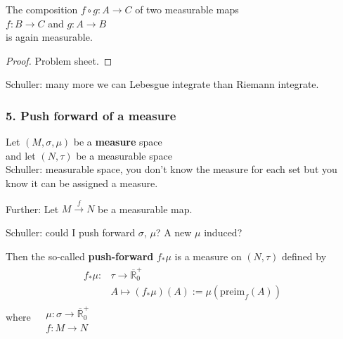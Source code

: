 \begin{theorem}
	The composition $f\circ g : A \to C$ of two measurable maps \\
	$f:B\to C$ and $g:A \to B$ \\
	is again measurable.
\end{theorem}

\begin{proof}
	Problem sheet.
\end{proof}

Schuller: many more we can Lebesgue integrate than Riemann integrate.

\subsubsection{5. Push forward of a measure}

Let $(M, \sigma, \mu)$ be a \textbf{measure} space \\
and let $(N, \tau)$ be a measurable space \\

Schuller: measurable space, you don't know the measure for each set but you know it can be assigned a measure.

Further: Let $M \xrightarrow{f} N$ be a measurable map.


Schuller: could I push forward $\sigma$, $\mu$? A new $\mu$ induced?

Then the so-called \textbf{push-forward} $f_*\mu$ is a measure on $(N, \tau)$ defined by 
\[
\begin{gathered}
\begin{aligned}
f_*\mu : & \tau \to \overline{\mathbb{R}}^+_0 \\
& A \mapsto (f_* \mu)(A) := \mu(\text{preim}_f(A))
\end{aligned}
\end{gathered}
\]
where $\begin{aligned}
	& \mu : \sigma \to \overline{\mathbb{R}}^+_0 \\
	& f: M \to N
\end{aligned}$

